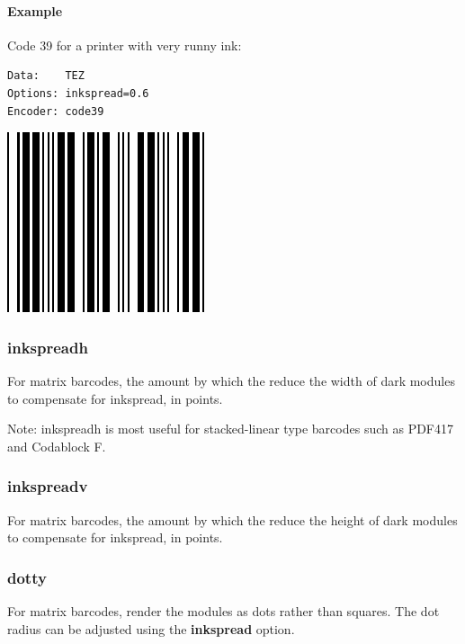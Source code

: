 \hypertarget{example-31}{%
\paragraph{Example}\label{example-31}}

Code 39 for a printer with very runny ink:

\begin{verbatim}
Data:    TEZ
Options: inkspread=0.6
Encoder: code39
\end{verbatim}

\includegraphics{images/optinkspread.eps}

\hypertarget{inkspreadh}{%
\subsubsection{inkspreadh}\label{inkspreadh}}

For matrix barcodes, the amount by which the reduce the width of dark
modules to compensate for inkspread, in points.

Note: inkspreadh is most useful for stacked-linear type barcodes such as
PDF417 and Codablock F.

\hypertarget{inkspreadv}{%
\subsubsection{inkspreadv}\label{inkspreadv}}

For matrix barcodes, the amount by which the reduce the height of dark
modules to compensate for inkspread, in points.

\hypertarget{dotty}{%
\subsubsection{dotty}\label{dotty}}

For matrix barcodes, render the modules as dots rather than squares. The
dot radius can be adjusted using the \textbf{inkspread} option.

